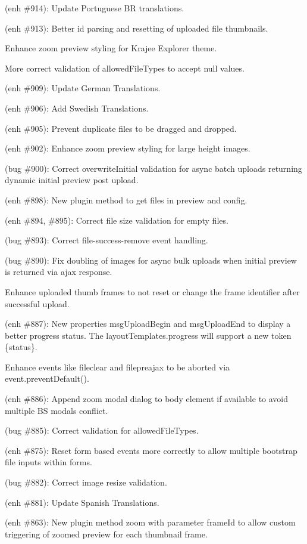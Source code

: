 \begin{DoxyItemize}
\item (enh \#914)\+: Update Portuguese BR translations.
\item (enh \#913)\+: Better id parsing and resetting of uploaded file thumbnails.
\item Enhance zoom preview styling for Krajee Explorer theme.
\item More correct validation of {\ttfamily allowed\+File\+Types} to accept null values.
\item (enh \#909)\+: Update German Translations.
\item (enh \#906)\+: Add Swedish Translations.
\item (enh \#905)\+: Prevent duplicate files to be dragged and dropped.
\item (enh \#902)\+: Enhance zoom preview styling for large height images.
\item (bug \#900)\+: Correct {\ttfamily overwrite\+Initial} validation for async batch uploads returning dynamic initial preview post upload.
\item (enh \#898)\+: New plugin method to get files in preview and config.
\item (enh \#894, \#895)\+: Correct file size validation for empty files.
\item (bug \#893)\+: Correct {\ttfamily file-\/success-\/remove} event handling.
\item (bug \#890)\+: Fix doubling of images for async bulk uploads when initial preview is returned via ajax response.
\item Enhance uploaded thumb frames to not reset or change the frame identifier after successful upload.
\item (enh \#887)\+: New properties {\ttfamily msg\+Upload\+Begin} and {\ttfamily msg\+Upload\+End} to display a better progress status. The {\ttfamily layout\+Templates.\+progress} will support a new token {\ttfamily \{status\}}.
\item Enhance events like {\ttfamily fileclear} and {\ttfamily filepreajax} to be aborted via {\ttfamily event.\+prevent\+Default()}.
\item (enh \#886)\+: Append zoom modal dialog to {\ttfamily body} element if available to avoid multiple BS modals conflict.
\item (bug \#885)\+: Correct validation for {\ttfamily allowed\+File\+Types}.
\item (enh \#875)\+: Reset form based events more correctly to allow multiple bootstrap file inputs within forms.
\item (bug \#882)\+: Correct image resize validation.
\item (enh \#881)\+: Update Spanish Translations.
\item (enh \#863)\+: New plugin method {\ttfamily zoom} with parameter {\ttfamily frame\+Id} to allow custom triggering of zoomed preview for each thumbnail frame.
\end{DoxyItemize}

